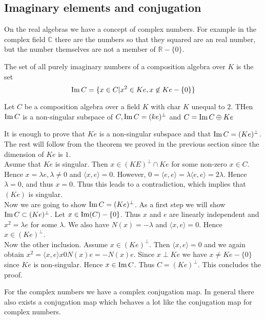 \documentclass[../Thesis.tex]{subfiles}
\begin{document}
\subsection{Imaginary elements and conjugation}
On the real algebras we have a concept of complex numbers. For example in the complex field $\mathbb{C}$ there are the numbers so that they squared are an real number, but the number themselves are not a member of $\mathbb{R}-\{0\}$.
\begin{mydef}
The set of all purely imaginary numbers of a composition algebra over $K$ is the set
\begin{equation}
\operatorname{Im} C = \{ x \in C | x^2 \in Ke, x \not\in Ke-\{0\}\}
\end{equation}
\end{mydef}
\begin{prop}
Let $C$ be a composition algebra over a field $K$ with char $K$ unequal to $2$. THen $\operatorname{Im} C$ is a non-singular subspace of $C, \operatorname{Im} C = (ke)^\perp$ and $C = \operatorname{Im} C \oplus Ke$
\end{prop}
\begin{myproof}
It is enough to prove that $Ke$ is a non-singular subspace and that $\operatorname{Im} C = (Ke)^\perp$. The rest will follow from the theorem we proved in the previous section since the dimension of $Ke$ is $1$.
\\Asume that $Ke$ is singular. Then $x \in (KE)^\perp \cap Ke$ for some non-zero $x \in C$. Hence $x = \lambda e, \lambda \neq 0$ and $\langle x, e \rangle = 0$. However, $0 = \langle e, e \rangle = \lambda \langle e, e \rangle = 2 \lambda$. Hence $\lambda = 0$, and thus $ x = 0$. Thus this leads to a contradiction, which implies that $(Ke)$ is singular.
\\Now we are going to show $\operatorname{Im} C = (Ke)^\perp$. As a first step we will show $\operatorname{Im} C \subset (Ke)^\perp$. Let $x \in \operatorname{Im} (C) - \{0\}$. Thus $x$ and $e$ are linearly independent and $x^2 = \lambda e$ for some $\lambda$. We also have $N(x) = -\lambda$ and $\langle x,e \rangle = 0$. Hence $x \in (Ke)^\perp$.  
\\Now the other inclusion. Assume $x \in (Ke)^\perp$. Then $\langle x, e \rangle = 0$ and we again obtain $x^2 = \langle x, e \rangle x 0 N(x)e = -N(x)e$. Since $x \perp Ke$ we have $x \neq Ke - \{0\}$ since $Ke$ is non-singular. Hence $x \in \operatorname{Im} C$. Thus $ C = (Ke)^\perp$. This concludes the proof.
\end{myproof}
For the complex numbers we have a complex conjugation map. In general there also exists a conjugation map which behaves a lot like the conjugation map for complex numbers.
\end{document}
